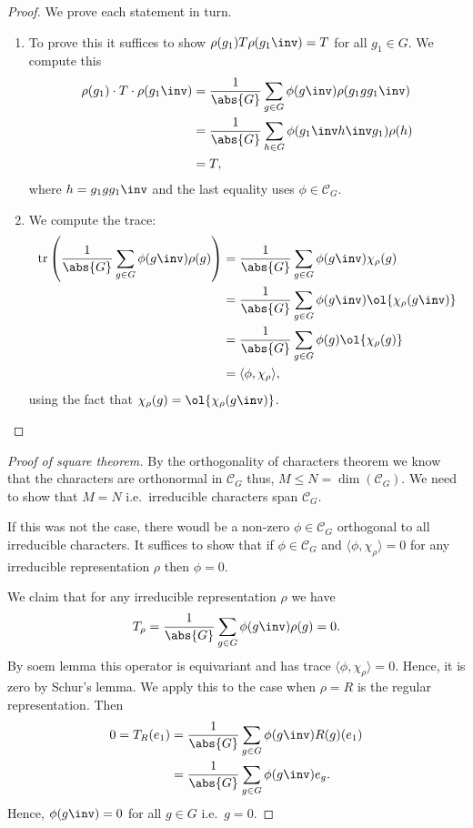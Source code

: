 \documentclass[12pt, a4paper]{article}
\begin{document}
\begin{proof}
    We prove each statement in turn.
    \begin{enumerate}
        \item To prove this it suffices to show \(\rho(g_1)T\rho(g_1\inv)=T\) for all \(g_1\in G\). We compute this 
        \[\begin{aligned}
            \rho(g_1) \cdot T \cdot \rho(g_1\inv) &= \frac{1}{\abs{G}} \sum_{g\in G} \phi(g\inv) \rho(g_1 gg_1\inv) \\
            &= \frac{1}{\abs{G}}\sum_{h\in G} \phi(g_1\inv h\inv g_1) \rho(h) \\
            &= T,
        \end{aligned}\]
        where \(h=g_1gg_1\inv\) and the last equality uses \(\phi\in \mathcal{C}_G\).
        \item We compute the trace:
        \[\begin{aligned}
            \text{tr}\left( \frac{1}{\abs{G}}\sum_{g\in G} \phi(g\inv)\rho(g) \right) &= \frac{1}{\abs{G}} \sum_{g\in G} \phi(g\inv)\chi_\rho(g) \\
            &= \frac{1}{\abs{G}} \sum_{g\in G} \phi(g\inv)\ol{\chi_{\rho}(g\inv)} \\
            &=  \frac{1}{\abs{G}} \sum_{g\in G} \phi(g)\ol{\chi_{\rho}(g)} \\
            &=\langle \phi, \chi_\rho \rangle,
        \end{aligned}\]
        using the fact that \(\chi_{\rho}(g)=\ol{\chi_{\rho}(g\inv)}\).
    \end{enumerate}
\end{proof}

\begin{proof}[Proof of square theorem]
    By the orthogonality of characters theorem we know that the characters are orthonormal in \(\mathcal{C}_G\) thus, \(M\leq N=\dim(\mathcal{C}_G)\). We need to show that \(M = N\) i.e.\ irreducible characters span \(\mathcal{C}_G\).

    If this was not the case, there woudl be a non-zero \(\phi\in \mathcal{C}_G\) orthogonal to all irreducible characters. It suffices to show that if \(\phi\in\mathcal{C}_G\) and \(\langle \phi,\chi_\rho\rangle =0\) for any irreducible representation \(\rho\) then \(\phi=0\).

    We claim that for any irreducible representation \(\rho\) we have 
    \[T_\rho = \frac{1}{\abs{G}} \sum_{g\in G} \phi(g\inv)\rho(g)=0.\]
    By soem lemma this operator is equivariant and has trace \(\langle \phi,\chi_\rho \rangle=0\). Hence, it is zero by Schur's lemma. We apply this to the case when \(\rho = R\) is  the regular representation. Then 
    \[\begin{aligned}
    0 = T_R(e_1) &= \frac{1}{\abs{G}}\sum_{g\in G} \phi(g\inv) R(g)(e_1) \\
    &=\frac{1}{\abs{G}} \sum_{g\in G}\phi(g\inv)e_g.
    \end{aligned}\]
    Hence, \(\phi(g\inv)=0\) for all \(g\in G\) i.e.\ \(g=0\).
\end{proof}
\end{document}
